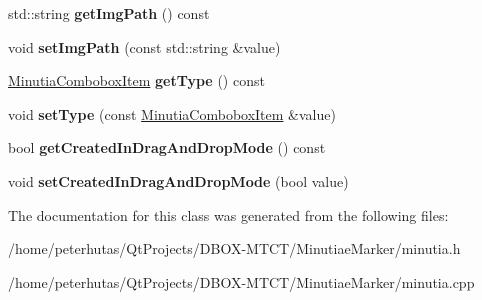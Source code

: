 \begin{DoxyCompactItemize}
std\+::string {\bfseries get\+Img\+Path} () const
\item 
\mbox{\label{class_minutia_a6d3533b962071f87d35c061635dc18c2}} 
void {\bfseries set\+Img\+Path} (const std\+::string \&value)
\item 
\mbox{\label{class_minutia_a722ae0f8c45096fc83b098c5c19d8b94}} 
\mbox{\hyperlink{class_minutia_combobox_item}{Minutia\+Combobox\+Item}} {\bfseries get\+Type} () const
\item 
\mbox{\label{class_minutia_a33b5a725ec97e7f4278a69e72c70d36a}} 
void {\bfseries set\+Type} (const \mbox{\hyperlink{class_minutia_combobox_item}{Minutia\+Combobox\+Item}} \&value)
\item 
\mbox{\label{class_minutia_ac0626f062eb3dd3cf36ba215ca075a07}} 
bool {\bfseries get\+Created\+In\+Drag\+And\+Drop\+Mode} () const
\item 
\mbox{\label{class_minutia_aac4901d3d6aac3b3085c97cd9e7cda7a}} 
void {\bfseries set\+Created\+In\+Drag\+And\+Drop\+Mode} (bool value)
\end{DoxyCompactItemize}


The documentation for this class was generated from the following files\+:\begin{DoxyCompactItemize}
\item 
/home/peterhutas/\+Qt\+Projects/\+D\+B\+O\+X-\/\+M\+T\+C\+T/\+Minutiae\+Marker/minutia.\+h\item 
/home/peterhutas/\+Qt\+Projects/\+D\+B\+O\+X-\/\+M\+T\+C\+T/\+Minutiae\+Marker/minutia.\+cpp\end{DoxyCompactItemize}

